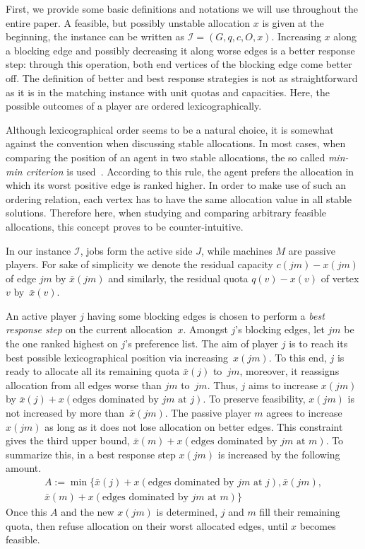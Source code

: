 \documentclass{llncs}
\begin{document}
First, we provide some basic definitions and notations we will use throughout the entire paper. A feasible, but possibly unstable allocation $x$ is given at the beginning, the instance can be written as $\mathcal{I}$$ = (G, q, c, O, x)$. Increasing $x$ along a blocking edge and possibly decreasing it along worse edges is a better response step: through this operation, both end vertices of the blocking edge come better off. The definition of better and best response strategies is not as straightforward as it is in the matching instance with unit quotas and capacities. Here, the possible outcomes of a player are ordered lexicographically.

Although lexicographical order seems to be a natural choice, it is somewhat against the convention when discussing stable allocations. In most cases, when comparing the position of an agent in two stable allocations, the so called \emph{min-min criterion} is used~\cite{DBLP:journals/mor/BaiouB02}. According to this rule, the agent prefers the allocation in which its worst positive edge is ranked higher. In order to make use of such an ordering relation, each vertex has to have the same allocation value in all stable solutions. Therefore here, when studying and comparing arbitrary feasible allocations, this concept proves to be counter-intuitive.

In our instance $\mathcal{I}$, jobs form the active side $J$, while machines $M$ are passive players. For sake of simplicity we denote the residual capacity $c(jm)-x(jm)$ of edge $jm$ by $\bar{x}(jm)$ and similarly, the residual quota $q(v)-x(v)$ of vertex $v$ by~$\bar{x}(v)$.

An active player $j$ having some blocking edges is chosen to perform a \emph{best response step} on the current allocation~$x$. Amongst $j$'s blocking edges, let $jm$ be the one ranked highest on $j$'s preference list. The aim of player $j$ is to reach its best possible lexicographical position via increasing~$x(jm)$. To this end, $j$ is ready to allocate all its remaining quota $\bar{x}(j)$ to~$jm$, moreover, it reassigns allocation from all edges worse than $jm$ to~$jm$. Thus, $j$ aims to increase $x(jm)$ by $\bar{x}(j) + x(\text{edges dominated by }jm \text{ at }j)$. To preserve feasibility, $x(jm)$ is not increased by more than~$\bar{x}(jm)$. The passive player $m$ agrees to increase $x(jm)$ as long as it does not lose allocation on better edges. This constraint gives the third upper bound, $\bar{x}(m) + x(\text{edges dominated by }jm \text{ at }m)$. To summarize this, in a best response step $x(jm)$ is increased by the following amount.
\begin{align*}
A := \min\{\bar{x}(j) + x(\text{edges dominated by }jm \text{ at }j), \bar{x}(jm), \\ \bar{x}(m) + x(\text{edges dominated by }jm \text{ at }m)\}
\end{align*}
Once this $A$ and the new $x(jm)$ is determined, $j$ and $m$ fill their remaining quota, then refuse allocation on their worst allocated edges, until $x$ becomes feasible.
\end{document}
